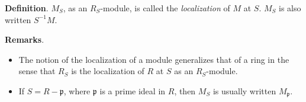 \documentclass[12pt]{article}
\begin{document}
\textbf{Definition}.  $M_S$, as an $R_S$-module, is called the \emph{localization} of $M$ at $S$.  $M_S$ is also written $S^{-1}M$.

\textbf{Remarks}.  
\begin{itemize}
\item
The notion of the localization of a module generalizes that of a ring in the sense that $R_S$ is the localization of $R$ at $S$ as an $R_S$-module.
\item
If $S=R-\mathfrak{p}$, where $\mathfrak{p}$ is a prime ideal in $R$, then $M_S$ is usually written $M_{\mathfrak{p}}$.
\end{itemize}
\end{document}
